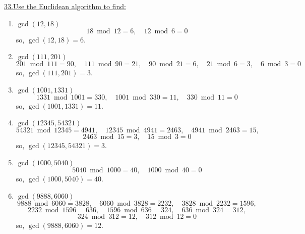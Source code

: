\documentclass[12pt]{article}
\begin{document}
\vspace{5mm}
\noindent\underline{33.\;Use the Euclidean algorithm to find:}
\begin{enumerate}[label=(\alph*)]
    \item $\gcd(12,18)$
    \[
    18 \bmod 12 = 6,\quad 12 \bmod 6 = 0
    \]
    so, $\gcd(12,18) = 6$.
    \item $\gcd(111,201)$
    \[
    201 \bmod 111 = 90,\quad 111 \bmod 90 = 21,\quad 90 \bmod 21 = 6,\quad 21 \bmod 6 = 3,\quad 6 \bmod 3 = 0
    \]
    so, $\gcd(111,201) = 3$.
    \item $\gcd(1001,1331)$
    \[
    1331 \bmod 1001 = 330,\quad 1001 \bmod 330 = 11,\quad 330 \bmod 11 = 0
    \]
    so, $\gcd(1001,1331) = 11$.
    \item $\gcd(12345,54321)$
    \[
    54321 \bmod 12345 = 4941,\quad 12345 \bmod 4941 = 2463,\quad 4941 \bmod 2463 = 15,
    \]
    \[
    2463 \bmod 15 = 3,\quad 15 \bmod 3 = 0
    \]
    so, $\gcd(12345,54321) = 3$.
    \item $\gcd(1000,5040)$
    \[
    5040 \bmod 1000 = 40,\quad 1000 \bmod 40 = 0
    \]
    so, $\gcd(1000,5040) = 40$.
    \item $\gcd(9888,6060)$
    \[
    9888 \bmod 6060 = 3828,\quad 6060 \bmod 3828 = 2232,\quad 3828 \bmod 2232 = 1596,
    \]
    \[
    2232 \bmod 1596 = 636,\quad 1596 \bmod 636 = 324,\quad 636 \bmod 324 = 312,
    \]
    \[
    324 \bmod 312 = 12,\quad 312 \bmod 12 = 0
    \]
    so, $\gcd(9888,6060) = 12$.
\end{enumerate}
\end{document}
